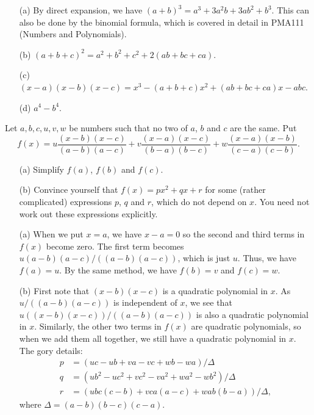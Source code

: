 \documentclass[a4paper]{book}
\newcommand{\Dl}        {\Delta}
\renewcommand{\:}{\colon}
\newcommand{\PMA}[1]{PMA#1}
\theoremstyle{definition}
\newenvironment{starex}{
 \renewcommand{\thetheorem}{\arabic{chapter}.\arabic{section}.\arabic{theorem}${}^*$}
 \exercise
}{\endexercise}
\renewenvironment{solution}{\SolutionInline}{\endSolutionInline}
\begin{document}
\begin{solution}
 \begin{itemize}
  \item[(a)] By direct expansion, we have
   $(a+b)^3=a^3+3a^2b+3ab^2+b^3$.  This can also be done by the
   binomial formula, which is covered in detail in \PMA{111} (Numbers
   and Polynomials).
  \item[(b)] $(a+b+c)^2=a^2+b^2+c^2+2(ab+bc+ca)$.
  \item[(c)] $(x-a)(x-b)(x-c)=x^3-(a+b+c)x^2+(ab+bc+ca)x-abc$.
  \item[(d)] $a^4-b^4$.
 \end{itemize}
\end{solution}

\begin{starex}
 Let $a,b,c,u,v,w$ be numbers such that no two of $a$, $b$ and $c$ are
 the same.  Put
 \[ f(x) = u\frac{(x-b)(x-c)}{(a-b)(a-c)} +
           v\frac{(x-a)(x-c)}{(b-a)(b-c)} +
           w\frac{(x-a)(x-b)}{(c-a)(c-b)}.
 \]
 \begin{itemize}
  \item[(a)] Simplify $f(a)$, $f(b)$ and $f(c)$.
  \item[(b)] Convince yourself that $f(x)=px^2+qx+r$ for some (rather
   complicated) expressions $p$, $q$ and $r$, which do not depend on
   $x$.  You need not work out these expressions explicitly.
 \end{itemize}
\end{starex}
\begin{solution}
 \begin{itemize}
  \item[(a)] When we put $x=a$, we have $x-a=0$ so the second and
   third terms in $f(x)$ become zero.  The first term becomes
   $u(a-b)(a-c)/((a-b)(a-c))$, which is just $u$.  Thus, we have
   $f(a)=u$.  By the same method, we have $f(b)=v$ and $f(c)=w$.
  \item[(b)] First note that $(x-b)(x-c)$ is a quadratic polynomial in
   $x$.  As $u/((a-b)(a-c))$ is independent of $x$, we see that
   $u((x-b)(x-c))/((a-b)(a-c))$ is also a quadratic polynomial in
   $x$.  Similarly, the other two terms in $f(x)$ are quadratic
   polynomials, so when we add them all together, we still have a
   quadratic polynomial in $x$.  The gory details:
   \begin{align*}
    p &= (uc-ub+va-vc+wb-wa)/\Dl \\
    q &= (ub^2-uc^2+vc^2-va^2+wa^2-wb^2)/\Dl \\
    r &= (ubc(c-b) + vca(a-c) + wab(b-a))/\Dl,
   \end{align*}
   where $\Dl=(a-b)(b-c)(c-a)$.
 \end{itemize}
\end{solution}
\end{document}
